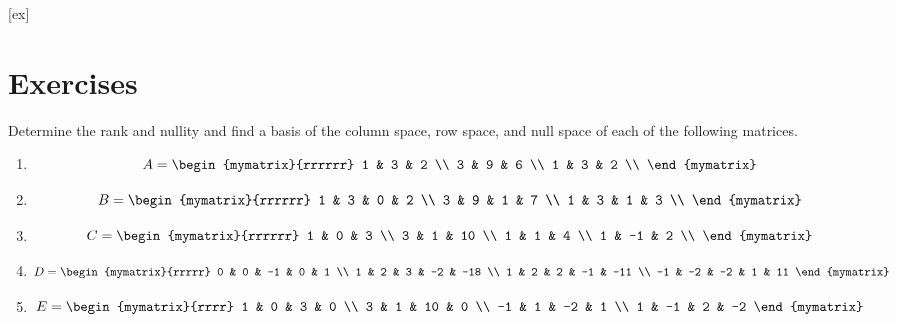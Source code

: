 [ex]
\section*{Exercises}


\begin{ex}
  Determine the rank and nullity and find a basis of the column
  space, row space, and null space of each of the following matrices.
  \begin{enumerate}
  \item
    \begin{equation*}
      A = \begin{mymatrix}{rrrrrr}
        1 & 3 & 2 \\ 
        3 & 9 & 6 \\ 
        1 & 3 & 2 \\
      \end{mymatrix} 
    \end{equation*}
  \item
    \begin{equation*}
      B = \begin{mymatrix}{rrrrrr}
        1 & 3 & 0 & 2 \\
        3 & 9 & 1 & 7 \\
        1 & 3 & 1 & 3 \\
      \end{mymatrix} 
    \end{equation*}
  \item
    \begin{equation*}
      C = \begin{mymatrix}{rrrrrr}
        1 & 0 & 3 \\
        3 & 1 & 10 \\
        1 & 1 & 4 \\
        1 & -1 & 2 \\
      \end{mymatrix}
    \end{equation*}
  \item
    \begin{equation*}
      D = \begin{mymatrix}{rrrrr}
        0 & 0 & -1 & 0 & 1 \\ 
        1 & 2 & 3 & -2 & -18 \\ 
        1 & 2 & 2 & -1 & -11 \\ 
        -1 & -2 & -2 & 1 & 11
      \end{mymatrix}
    \end{equation*}
  \item
    \begin{equation*}
      E = \begin{mymatrix}{rrrr}
        1 & 0 & 3 & 0 \\ 
        3 & 1 & 10 & 0 \\ 
        -1 & 1 & -2 & 1 \\ 
        1 & -1 & 2 & -2
      \end{mymatrix}
    \end{equation*}
  \end{enumerate}
\end{ex}

